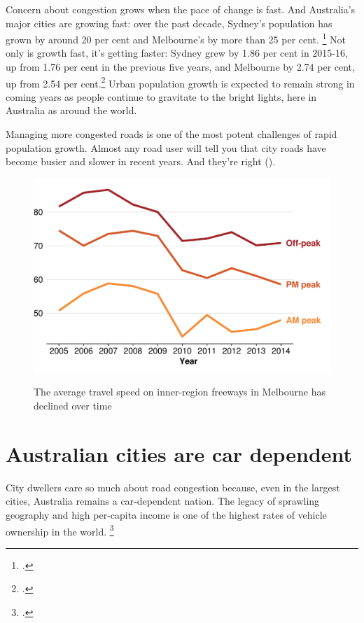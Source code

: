 \documentclass{grattan}
\begin{document}
Concern about congestion grows when the pace of change is fast.
And Australia's major cities are growing fast: over the past decade, Sydney's population has grown by around 20 per cent and Melbourne's by more than 25 per cent.%
\footcite{ABS-2016-Regional-Population-Growth}
Not only is growth fast, it's getting faster: Sydney grew by 1.86 per cent in 2015-16, up from 1.76 per cent in the previous five years, and Melbourne by 2.74 per cent, up from 2.54 per cent.\footcite{ABS-population-March-2017} Urban population growth is expected to remain strong in coming years as people continue to gravitate to the bright lights, here in Australia as around the world.

Managing more congested roads is one of the most potent challenges of rapid population growth.
Almost any road user will tell you that city roads have become busier and slower in recent years.
And they're right
().

\begin{figure}
\caption{The average travel speed on inner-region freeways in Melbourne has declined over time\label{fig:speed-Vic-freeways-vs-year}}
\units{\kmh}
\includegraphics{atlas/freeway_speed-vs-year--MEL-1.pdf}
%
{\textcite{Vicroads-201415-TravelSpeed-tableau}}
\end{figure}

\section{Australian cities are car dependent}
City dwellers care so much about road congestion because, even in the largest cities, Australia remains a car-dependent nation. The legacy of sprawling geography and high per-capita income is one of the highest rates of vehicle ownership in the world.%
    \footcite[][9]{Austroads-2016-Congestion-Reliability-Review}
\end{document}
